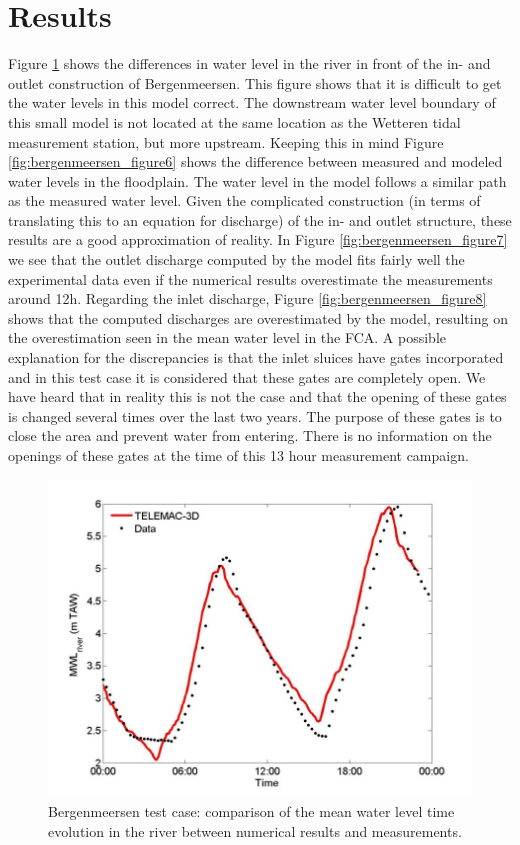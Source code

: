 \section{Results}

Figure \ref{fig:bergenmeersen_figure5} shows the differences in water level in the 
river in front of the in- and outlet construction of Bergenmeersen. 
This figure shows that it is difficult to get the water levels in this model correct. 
The downstream water level boundary of this small model is not located at the same location 
as the Wetteren tidal measurement station, but more upstream.
Keeping this in mind Figure \ref{fig:bergenmeersen_figure6} shows the difference between measured 
and modeled water levels in the floodplain. 
The water level in the model follows a similar path as the measured water level. 
Given the complicated construction (in terms of translating this to an equation for discharge) 
of the in- and outlet structure, these results are a good approximation of reality.
In Figure \ref{fig:bergenmeersen_figure7} we see that the outlet discharge computed by the model fits 
fairly well the experimental data even if the numerical results overestimate the measurements around 12h. 
Regarding the inlet discharge, Figure \ref{fig:bergenmeersen_figure8} shows that the computed discharges are 
overestimated by the model, resulting on the overestimation seen in the mean water level in the FCA. 
A possible explanation for the discrepancies is that the inlet sluices have gates incorporated 
and in this test case it is considered that these gates are completely open. 
We have heard that in reality this is not the case and that the opening of these gates is 
changed several times over the last two years. 
The purpose of these gates is to close the area and prevent water from entering. 
There is no information on the openings of these gates at the time of this 13 hour measurement campaign.

\begin{figure}[H]
\begin{center}
  \includegraphics[scale=1]{figure5.png}
\end{center}
\caption{Bergenmeersen test case: comparison of the mean water level time evolution in the 
river between numerical results and measurements.}
\label{fig:bergenmeersen_figure5}
\end{figure}


